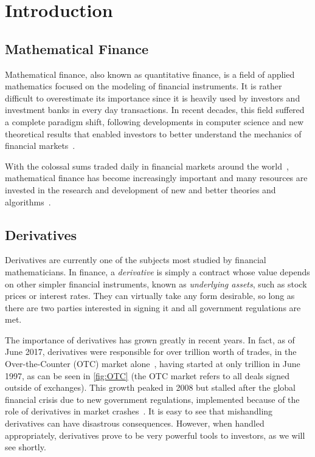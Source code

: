 \chapter{Introduction}
\label{chapter:introduction}
\section{Mathematical Finance}
\label{section:mathematical finance}
Mathematical finance, also known as quantitative finance, is a field of applied mathematics focused on the modeling of financial instruments.
It is rather difficult to overestimate its importance since it is heavily used by investors and investment banks in every day transactions.
In recent decades, this field suffered a complete paradigm shift, following developments in computer science and new theoretical results that enabled investors to better understand the mechanics of financial markets~\citep{compfinance}.

With the colossal sums traded daily in financial markets around the world~\citep{WFE}, mathematical finance has become increasingly important and many resources are invested in the research and development of new and better theories and algorithms~\citep{quants}.


\section{Derivatives}
\label{section:derivatives}
Derivatives are currently one of the subjects most studied by financial mathematicians.
In finance, a \emph{derivative} is simply a contract whose value depends on other simpler financial instruments, known as \emph{underlying assets}, such as stock prices or interest rates.
They can virtually take any form desirable, so long as there are two parties interested in signing it and all government regulations are met.


The importance of derivatives has grown greatly in recent years. In fact, as of June 2017, derivatives were responsible for over  trillion worth of trades, in the Over-the-Counter (OTC) market alone~\citep{BIS}, having started at only  trillion in June 1997, as can be seen in \autoref{fig:OTC} (the OTC market refers to all deals signed outside of exchanges).
This growth peaked in 2008 but stalled after the global financial crisis due to new government regulations, implemented because of the role of derivatives in market crashes~\citep{FT}. It is easy to see that mishandling derivatives can have disastrous consequences. However, when handled appropriately, derivatives prove to be very powerful tools to investors, as we will see shortly.


